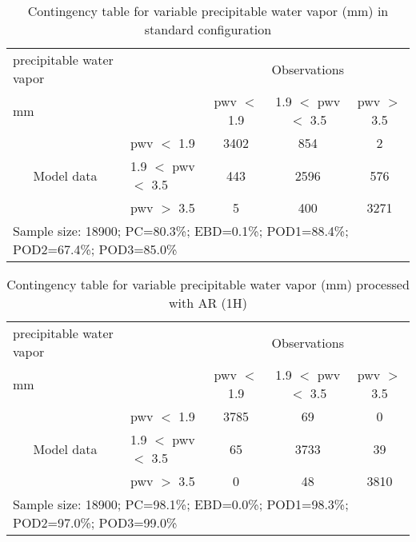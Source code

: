 \documentclass[11pt,english]{article}
\begin{document}
\begin{table}[]
\begin{center}
\begin{tabular}{llccc}
\hline
{precipitable water vapor}                                       &                                                    & \multicolumn{3}{c}{Observations}                 \\
{mm}                                       &                             & pwv $<$ 1.9   & 1.9 $<$ pwv $<$ 3.5 & pwv $>$ 3.5 \\
\hline
\multicolumn{1}{c}{\multirow{3}{*}{Model data}}  & pwv $<$ 1.9             & 3402                & 854                       & 2              \\
                                                 & 1.9  $<$ pwv $<$ 3.5 & 443                & 2596                       & 576              \\
                                                 & pwv $>$ 3.5             & 5                & 400                       & 3271              \\
\hline
\multicolumn{5}{l}{Sample size: 18900; PC=80.3\%; EBD=0.1\%; POD1=88.4\%; POD2=67.4\%; POD3=85.0\%}                 \\
\end{tabular}
\end{center}
\caption{Contingency table for variable precipitable water vapor (mm) in standard configuration}
\label{tab:contingencypwvBEF}
\end{table}
\begin{table}[]
\begin{center}
\begin{tabular}{llccc}
\hline
{precipitable water vapor}                                       &                                                    & \multicolumn{3}{c}{Observations}                 \\
{mm}                                       &                             & pwv $<$ 1.9   & 1.9 $<$ pwv $<$ 3.5 & pwv $>$ 3.5 \\
\hline
\multicolumn{1}{c}{\multirow{3}{*}{Model data}}  & pwv $<$ 1.9             & 3785                & 69                       & 0              \\
                                                 & 1.9  $<$ pwv $<$ 3.5 & 65                & 3733                       & 39              \\
                                                 & pwv $>$ 3.5             & 0                & 48                       & 3810              \\
\hline 
\multicolumn{5}{l}{Sample size: 18900; PC=98.1\%; EBD=0.0\%; POD1=98.3\%; POD2=97.0\%; POD3=99.0\%}
\end{tabular}
\end{center}
\caption{Contingency table for variable precipitable water vapor (mm) processed with AR (1H)}
\label{tab:contingencypwvAFT}
\end{table}
\end{document}
